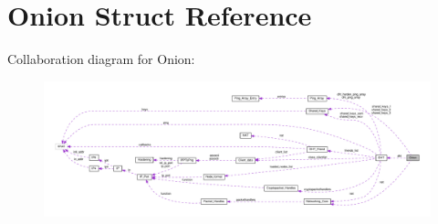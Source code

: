 \hypertarget{struct_onion}{\section{Onion Struct Reference}
\label{struct_onion}
}


Collaboration diagram for Onion\+:
\nopagebreak
\begin{figure}[H]
\begin{center}
\leavevmode
\includegraphics[width=350pt]{struct_onion__coll__graph}
\end{center}
\end{figure}
